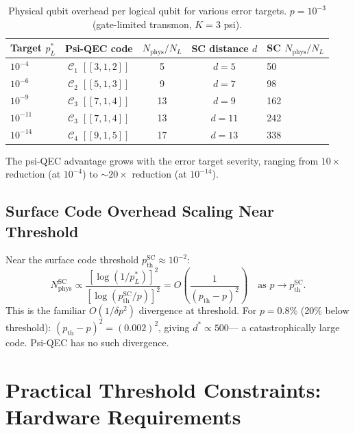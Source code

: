 \documentclass[11pt]{article}
\theoremstyle{definition}
\theoremstyle{remark}
\begin{document}
\begin{table}[h]
\centering
\caption{Physical qubit overhead per logical qubit for various error targets.
  $p = 10^{-3}$ (gate-limited transmon, $K=3$ psi).}
\label{tab:overhead-comparison}
\begin{tabular}{@{}lcccl@{}}
\toprule
Target $p_L^*$ & Psi-QEC code & $N_{\mathrm{phys}}/N_L$ & SC distance $d$ & SC $N_{\mathrm{phys}}/N_L$ \\
\midrule
$10^{-4}$ & $\mathcal{C}_1$ $[[3,1,2]]$ & 5 & $d=5$ & 50 \\
$10^{-6}$ & $\mathcal{C}_2$ $[[5,1,3]]$ & 9 & $d=7$ & 98 \\
$10^{-9}$ & $\mathcal{C}_3$ $[[7,1,4]]$ & 13 & $d=9$ & 162 \\
$10^{-11}$ & $\mathcal{C}_3$ $[[7,1,4]]$ & 13 & $d=11$ & 242 \\
$10^{-14}$ & $\mathcal{C}_4$ $[[9,1,5]]$ & 17 & $d=13$ & 338 \\
\bottomrule
\end{tabular}
\end{table}

The psi-QEC advantage grows with the error target severity, ranging from
$10\times$ reduction (at $10^{-4}$) to $\sim20\times$ reduction (at $10^{-14}$).

\subsection{Surface Code Overhead Scaling Near Threshold}
\label{sec:sc-scaling}

Near the surface code threshold $p_{\mathrm{th}}^{\mathrm{SC}} \approx 10^{-2}$:
\begin{equation}
  N_{\mathrm{phys}}^{\mathrm{SC}} \propto \frac{[\log(1/p_L^*)]^2}{[\log(p_{\mathrm{th}}^{\mathrm{SC}}/p)]^2}
  = O\!\left(\frac{1}{(p_{\mathrm{th}}-p)^2}\right) \quad \text{as } p \to p_{\mathrm{th}}^{\mathrm{SC}}.
  \label{eq:sc-near-threshold}
\end{equation}
This is the familiar $O(1/\delta p^2)$ divergence at threshold.  For $p = 0.8\%$
(20\% below threshold): $(p_{\mathrm{th}}-p)^2 = (0.002)^2$, giving $d^* \propto 500$---
a catastrophically large code.  Psi-QEC has no such divergence.

\section{Practical Threshold Constraints: Hardware Requirements}
\label{sec:hardware}
\end{document}
